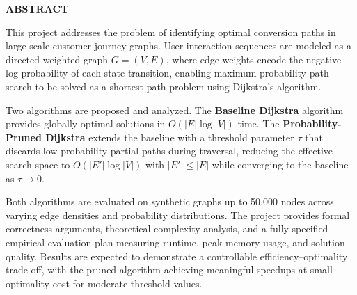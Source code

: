 {}

\begin{center}
    \large{\bf ABSTRACT}
\end{center}

This project addresses the problem of identifying optimal conversion paths in large-scale customer journey graphs. User interaction sequences are modeled as a directed weighted graph $G=(V,E)$, where edge weights encode the negative log-probability of each state transition, enabling maximum-probability path search to be solved as a shortest-path problem using Dijkstra's algorithm.

Two algorithms are proposed and analyzed. The \textbf{Baseline Dijkstra} algorithm provides globally optimal solutions in $O(|E|\log|V|)$ time. The \textbf{Probability-Pruned Dijkstra} extends the baseline with a threshold parameter $\tau$ that discards low-probability partial paths during traversal, reducing the effective search space to $O(|E'|\log|V|)$ with $|E'|\leq|E|$ while converging to the baseline as $\tau\to 0$.

Both algorithms are evaluated on synthetic graphs up to 50,000 nodes across varying edge densities and probability distributions. The project provides formal correctness arguments, theoretical complexity analysis, and a fully specified empirical evaluation plan measuring runtime, peak memory usage, and solution quality. Results are expected to demonstrate a controllable efficiency--optimality trade-off, with the pruned algorithm achieving meaningful speedups at small optimality cost for moderate threshold values.
